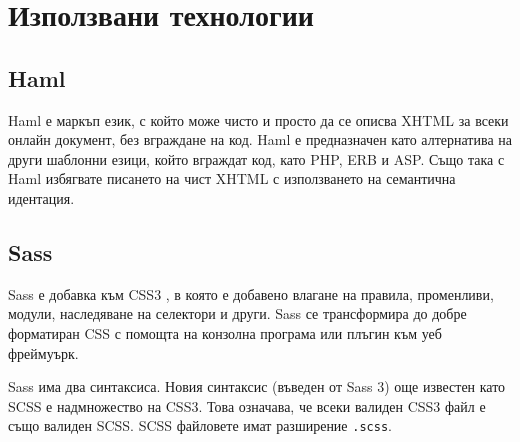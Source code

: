 \documentclass[a4paper]{article}
\begin{document}

\section{Използвани технологии}

  \subsection{Haml}
  Haml е \cite{haml} маркъп език, с който може чисто и просто да се описва XHTML за всеки онлайн документ, без вграждане на код. Haml е предназначен като алтернатива на други шаблонни езици, който вграждат код, като PHP, ERB и ASP. Също така с Haml избягвате писането на чист XHTML с използването на семантична идентация.

  \subsection{Sass}
  Sass \cite{sass} е добавка към CSS3 \cite{css}, в която е добавено влагане на правила, променливи, модули, наследяване на селектори и други. Sass се трансформира до добре форматиран CSS с помощта на конзолна програма или плъгин към уеб фреймуърк.

  Sass има два синтаксиса. Новия синтаксис (въведен от Sass 3) още известен като SCSS е надмножество на CSS3. Това означава, че всеки валиден CSS3 файл е също валиден SCSS. SCSS файловете имат разширение \texttt{.scss}.

\end{document}
